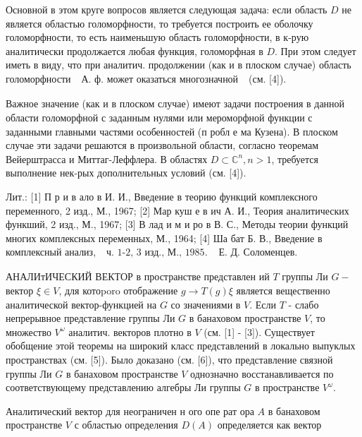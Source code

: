 \documentclass[10pt]{article}
\begin{document}
Основной в этом круге вопросов является следующая задача: если область $D$ не является областью голоморфности, то требуется построить ее оболочку голоморфности, то есть наименьшую область голоморфности, в к-рую аналитически продолжается любая функция, голоморфная в $D$. При этом следует иметь в виду, что при аналитич. продолжении (как и в плоском случае) область голоморфности $\begin{array}{ll}\text { А. ф. может оказаться многозначной }\end{array}$ (см. [4]).



Важное значение (как и в плоском случае) имеют задачи построения в данной области голоморфной с заданным нулями или мероморфной функции с заданными главными частями особенностей (п робл е ма Кузена). В плоском случае эти задачи решаются в произвольной области, согласно теоремам Вейерштрасса и Миттаг-Леффлера. В областях $D \subset \mathbb{C}^{n}, n>1$, требуется выполнение нек-рых дополнительных условий (см. [4]).



Лит.: [1] П р и в ало в И. И., Введение в теорию функций комплексного переменного, 2 изд., М., 1967; [2] Мар куш е в ич А. И., Теория аналитических функший, 2 изд., М., 1967; [3] В лад и м и ро в В. С., Методы теории функций многих комплексных переменных, М., 1964; [4] Ша бат Б. В., Введение в комплексный анализ, $\begin{array}{ll}\text { ч. 1-2, } 3 \text { изд., М., } 1985 . & \text { Е. Д. Соломенцев. }\end{array}$



АНАЛИтИЧЕСКИЙ ВЕКТОР в пространстве представлен ий $T$ группы Ли $G-$ вектор $\xi \in V$, для котоporo отображение $g \rightarrow T(g) \xi$ является вещественно аналитической вектор-функцией на $G$ со значениями в $V$. Если $T$ - слабо непрерывное представление группы Ли $G$ в банаховом пространстве $V$, то множество $V^{\omega}$ аналитич. векторов плотно в $V$ (см. [1] - [3]). Существует обобщение этой теоремы на широкий класс представлений в локально выпуклых пространствах (см. [5]). Было доказано (см. [6]), что представление связной группы Ли $G$ в банаховом пространстве $V$ однозначно восстанавливается по соответствующему представлению алгебры Ли группы $G$ в пространстве $V^{\omega}$.



Аналитический вектор для неограничен н ого опе рат ора $A$ в банаховом пространстве $V$ с областью определения $D(A)$ определяется как вектор
\end{document}

